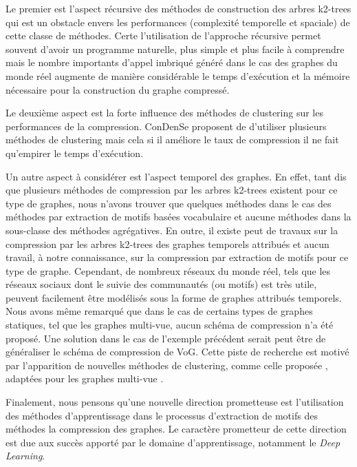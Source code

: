 Le premier est l'aspect récursive des méthodes de construction des arbres k2-trees qui est un obstacle envers les performances (complexité temporelle et spaciale) de cette classe de méthodes. Certe l'utilisation de l'approche récursive permet souvent d'avoir un programme naturelle, plus simple et plus facile à comprendre mais le nombre importants d'appel imbriqué généré dans le cas des graphes du monde réel augmente de manière considérable le temps d'exécution et la mémoire nécessaire pour la construction du graphe compressé. 

Le deuxième aspect est la forte influence des méthodes de clustering sur les performances de la compression. \gls{ConDenSe} proposent de d'utiliser plusieurs méthodes de clustering mais cela si il améliore le taux de compression il ne fait qu'empirer le temps d'exécution. 

Un autre aspect à considérer est l'aspect temporel des graphes. En effet, tant dis que plusieurs méthodes de compression par les arbres k2-trees existent pour ce type de graphes, nous n'avons trouver que quelques méthodes dans le cas des méthodes par extraction de motifs basées vocabulaire et aucune méthodes dans la sous-classe des méthodes agrégatives. En outre, il existe peut de travaux sur la compression par les arbres k2-trees des graphes temporels attribués et aucun travail, à notre connaissance, sur la compression par extraction de motifs pour ce type de graphe. Cependant, de nombreux réseaux du monde réel, tels que les réseaux sociaux dont le suivie des communautés (ou motifs) est très utile, peuvent facilement être modélisés sous la forme de graphes attribués temporels. Nous avons même remarqué que dans le cas de certains types de graphes statiques, tel que les graphes multi-vue, aucun schéma de compression n'a été proposé. Une solution dans le cas de l'exemple précédent serait peut être de généraliser le schéma de compression de VoG. Cette piste de recherche est motivé par l'apparition de nouvelles méthodes de clustering, comme celle proposée \citep{wang2019study}, adaptées pour les graphes multi-vue .


Finalement, nous pensons qu'une nouvelle direction prometteuse est l'utilisation des méthodes d'apprentissage dans le processus d'extraction de motifs des méthodes la compression des graphes. Le caractère prometteur de cette direction est due aux succès apporté par le domaine d'apprentissage, notamment le \textit{Deep Learning}. %
								

